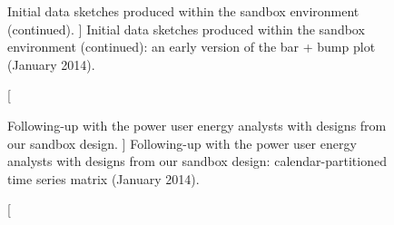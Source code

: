 

\begin{figure}
	\centering
	\caption
	[
	    Initial data sketches produced within the sandbox environment (continued).
	]
	{
    	Initial data sketches produced within the sandbox environment (continued): an early version of the bar + bump plot (January 2014). 
	}
	\centering
	\label{app:emu:fig:initial-sketches-2}
\end{figure}



\begin{figure}
	\centering
	\caption
	[
	    Following-up with the power user energy analysts with designs from our sandbox design.
	]
	{
    	Following-up with the power user energy analysts with designs from our sandbox design: calendar-partitioned time series matrix (January 2014). 
	}
	\centering
	\label{app:emu:fig:follow-up}
\end{figure}

